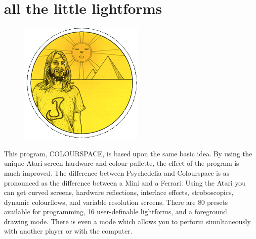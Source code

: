 \chapter{all the little lightforms} 
\label{sec:patterns}
\rhead[]{\leftmark}
\lstset{style=6502Style}
\lstset{ 
   aboveskip=5pt,
   belowskip=0pt,
}

\begin{definition}
\setlength{\intextsep}{0pt}%
\setlength{\columnsep}{3pt}%
\begin{figure}
\includegraphics[width=\linewidth]{src/callout/psych.png} 
\end{figure}
\small
This program, COLOURSPACE, is based upon the same basic idea.  By using the
unique Atari screen hardware and colour pallette, the effect of the program is
much improved.  The difference between Psychedelia and Colourspace is as
pronounced as the difference between a Mini and a Ferrari.  Using the Atari you
can get curved screens, hardware reflections, interlace effects, stroboscopics,
dynamic colourflows, and variable resolution screens.  There are 80 presets
available for programming, 16 user-definable lightforms, and a foreground
drawing mode.  There is even a mode which allows you to perform simultaneously
with another player or with the computer.
\end{definition}


